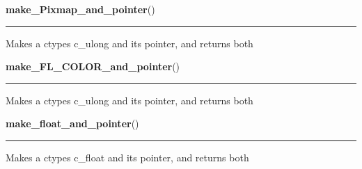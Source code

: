     \label{xformslib:library:make_ulong_and_pointer}

    \vspace{0.5ex}

\hspace{.8\funcindent}\begin{boxedminipage}{\funcwidth}

    \raggedright \textbf{make\_Pixmap\_and\_pointer}()

    \vspace{-1.5ex}

    \rule{\textwidth}{0.5\fboxrule}
\setlength{\parskip}{2ex}
    Makes a ctypes c\_ulong and its pointer, and returns both

\setlength{\parskip}{1ex}
    \end{boxedminipage}

    \label{xformslib:library:make_ulong_and_pointer}

    \vspace{0.5ex}

\hspace{.8\funcindent}\begin{boxedminipage}{\funcwidth}

    \raggedright \textbf{make\_FL\_COLOR\_and\_pointer}()

    \vspace{-1.5ex}

    \rule{\textwidth}{0.5\fboxrule}
\setlength{\parskip}{2ex}
    Makes a ctypes c\_ulong and its pointer, and returns both

\setlength{\parskip}{1ex}
    \end{boxedminipage}

    \label{xformslib:library:make_float_and_pointer}

    \vspace{0.5ex}

\hspace{.8\funcindent}\begin{boxedminipage}{\funcwidth}

    \raggedright \textbf{make\_float\_and\_pointer}()

    \vspace{-1.5ex}

    \rule{\textwidth}{0.5\fboxrule}
\setlength{\parskip}{2ex}
    Makes a ctypes c\_float and its pointer, and returns both

\setlength{\parskip}{1ex}
    \end{boxedminipage}

